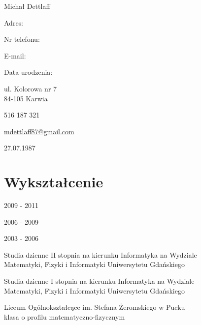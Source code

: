 \documentclass[letterpaper]{article}
\def\name{Michał Dettlaff}
\renewenvironment{itemize}{
  \begin{list}{}{
    \setlength{\leftmargin}{1.5em}
  }
}{
  \end{list}
}
\begin{document}
{\huge \name}


\vspace{0.25in}

\begin{minipage}{0.30\linewidth}
  \begin{itemize}
    \item Adres:\\
    \item Nr telefonu:
    \item E-mail:
    \item Data urodzenia:
  \end{itemize}
\end{minipage}
\begin{minipage}{0.70\linewidth}
  \begin{itemize}
    \item ul. Kolorowa nr 7\\
    84-105 Karwia
    \item 516 187 321
    \item \href{mailto:mdettlaff87@gmail.com}{mdettlaff87@gmail.com}
    \item 27.07.1987
  \end{itemize}
\end{minipage}

\vspace{0.10in}

\section*{Wykształcenie}

\begin{minipage}{0.30\linewidth}
  \begin{itemize}
    \item 2009 - 2011\\
    \item 2006 - 2009\\
    \item 2003 - 2006\\
  \end{itemize}
\end{minipage}
\begin{minipage}{0.70\linewidth}
  \begin{itemize}
    \item Studia dzienne II stopnia na kierunku Informatyka na Wydziale\\
    Matematyki, Fizyki i Informatyki Uniwersytetu Gdańskiego
    \item Studia dzienne I stopnia na kierunku Informatyka na Wydziale\\
    Matematyki, Fizyki i Informatyki Uniwersytetu Gdańskiego
    \item Liceum Ogólnokształcące im. Stefana Żeromskiego w Pucku\\
    klasa o profilu matematyczno-fizycznym
  \end{itemize}
\end{minipage}
\end{document}
